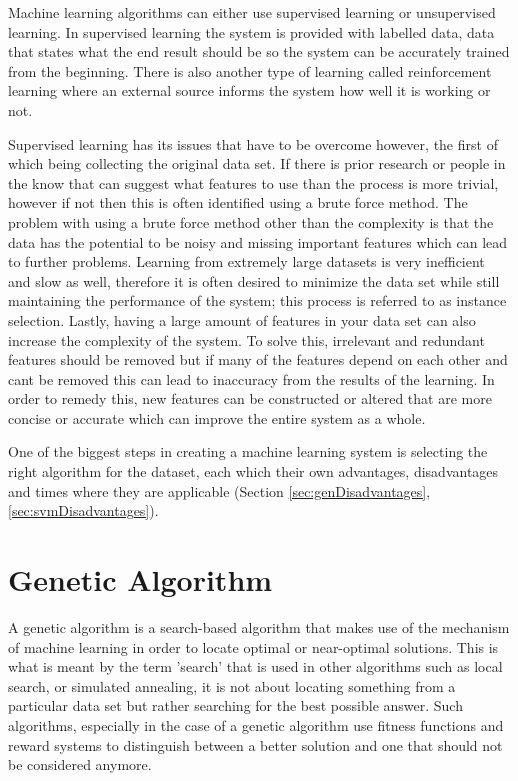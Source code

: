 Machine learning algorithms can either use supervised learning or unsupervised learning.  In supervised learning the system is provided with labelled data, data that states what the end result should be so the system can be accurately trained from the beginning.  There is also another type of learning called reinforcement learning where an external source informs the system how well it is working or not.

Supervised learning has its issues that have to be overcome however, the first of which being collecting the original data set.  If there is prior research or people in the know that can suggest what features to use than the process is more trivial, however if not then this is often identified using a brute force method.  The problem with using a brute force method other than the complexity is that the data has the potential to be noisy and missing important features which can lead to further problems.  Learning from extremely large datasets is very inefficient and slow as well, therefore it is often desired to minimize the data set while still maintaining the performance of the system; this process is referred to as instance selection.  Lastly, having a large amount of features in your data set can also increase the complexity of the system.  To solve this, irrelevant and redundant features should be removed but if many of the features depend on each other and cant be removed this can lead to inaccuracy from the results of the learning.  In order to remedy this, new features can be constructed or altered that are more concise or accurate which can improve the entire system as a whole.

One of the biggest steps in creating a machine learning system is selecting the right algorithm for the dataset, each which their own advantages, disadvantages and times where they are applicable (Section \ref{sec:genDisadvantages}, \ref{sec:svmDisadvantages}). 

\section{Genetic Algorithm}

A genetic algorithm is a search-based algorithm that makes use of the mechanism of machine learning in order to locate optimal or near-optimal solutions.  This is what is meant by the term 'search' that is used in other algorithms such as local search, or simulated annealing, it is not about locating something from a particular data set but rather searching for the best possible answer.  Such algorithms, especially in the case of a genetic algorithm use fitness functions and reward systems to distinguish between a better solution and one that should not be considered anymore.  %

